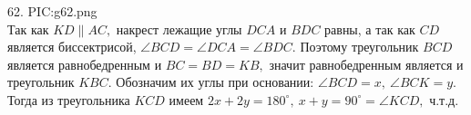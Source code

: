 62. {{PIC:g62.png}}\\
Так как $KD\parallel AC,$ накрест лежащие углы $DCA$ и $BDC$ равны, а так как $CD$ является биссектрисой, $\angle BCD=\angle DCA=\angle BDC.$ Поэтому треугольник $BCD$ является равнобедренным и $BC=BD=KB,$ значит равнобедренным является и треугольник $KBC.$ Обозначим их углы при основании: $\angle BCD=x,\ \angle BCK=y.$ Тогда из треугольника $KCD$ имеем $2x+2y=180^\circ,\ x+y=90^\circ=\angle KCD,$ ч.т.д.\newpage\noindent
